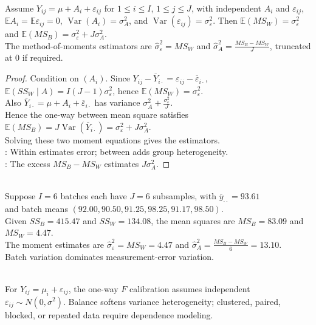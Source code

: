 \begin{proposition} \label{prop:random-effects-one-way-expected-mean-squares} \\
Assume $Y_{ij}=\mu+A_i+\varepsilon_{ij}$ for $1\leq i\leq I$, $1\leq j\leq J$, with independent $A_i$ and $\varepsilon_{ij}$, $\mathbb{E}A_i=\mathbb{E}\varepsilon_{ij}=0$, $\operatorname{Var}(A_i)=\sigma_A^2$, and $\operatorname{Var}(\varepsilon_{ij})=\sigma_\varepsilon^2$. Then $\mathbb{E}(MS_W)=\sigma_\varepsilon^2$ and $\mathbb{E}(MS_B)=\sigma_\varepsilon^2+J\sigma_A^2$.\\
The method-of-moments estimators are $\widehat{\sigma}_\varepsilon^2=MS_W$ and $\widehat{\sigma}_A^2=\frac{MS_B-MS_W}{J}$, truncated at $0$ if required.
\begin{proof} Condition on $(A_i)$. Since $Y_{ij}-\overline{Y}_{i\cdot}=\varepsilon_{ij}-\overline{\varepsilon}_{i\cdot}$, $\mathbb{E}(SS_W\mid A)=I(J-1)\sigma_\varepsilon^2$, hence $\mathbb{E}(MS_W)=\sigma_\varepsilon^2$.\\
Also $\overline{Y}_{i\cdot}=\mu+A_i+\overline{\varepsilon}_{i\cdot}$ has variance $\sigma_A^2+\frac{\sigma_\varepsilon^2}{J}$.\\
Hence the one-way between mean square satisfies $\mathbb{E}(MS_B)=J\operatorname{Var}(\overline{Y}_{i\cdot})=\sigma_\varepsilon^2+J\sigma_A^2$.\\
Solving these two moment equations gives the estimators.\\
: Within estimates error; between adds group heterogeneity.\\
: The excess $MS_B-MS_W$ estimates $J\sigma_A^2$.
\end{proof}
\end{proposition}

\begin{example} \label{ex:dye-batch-random-effects-estimates} \\
Suppose $I=6$ batches each have $J=6$ subsamples, with $\overline{y}_{\cdot\cdot}=93.61$\\
and batch means $(92.00,90.50,91.25,98.25,91.17,98.50)$.\\
Given $SS_B=415.47$ and $SS_W=134.08$, the mean squares are $MS_B=83.09$ and $MS_W=4.47$.\\
The moment estimates are $\widehat{\sigma}_\varepsilon^2=MS_W=4.47$ and $\widehat{\sigma}_A^2=\frac{MS_B-MS_W}{6}=13.10$.\\
Batch variation dominates measurement-error variation.
\end{example}

\begin{remark} \label{rem:one-way-anova-assumptions} \\
For $Y_{ij}=\mu_i+\varepsilon_{ij}$, the one-way $F$ calibration assumes independent $\varepsilon_{ij}\sim N(0,\sigma^2)$. Balance softens variance heterogeneity; clustered, paired, blocked, or repeated data require dependence modeling.
\end{remark}
